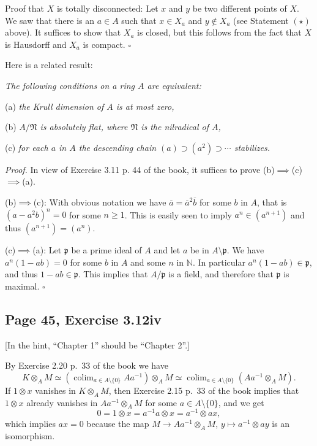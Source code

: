 \documentclass[parskip=half,fontsize=12pt]{scrartcl}%
\newcommand{\mf}{\mathfrak}
\newcommand{\mmm}{\mf m}
\newcommand{\ppp}{\mf p}
\DeclareMathOperator*{\colim}{colim}
\begin{document}
%
\begin{comment}
Let $\mu\in\mf m\subset A$ with $\mf m$ maximal. By Section~\ref{310ii} p.~\pageref{310ii} above, it suffices to show that, in the above notation, we have $\overline\mu=\overline0$. By Corollary 3.12 p.~42 of the book, this is equivalent to showing that the element $\mu/1$ of $A_\mmm$ is nilpotent, which is clear since $\mf m$ is a minimal prime ideal of $A$ (and thus $\mmm_\mmm$ is the nilradical of $A_\mmm$). $\square$
\end{comment}
%

Proof that $X$ is totally disconnected: Let $x$ and $y$ be two different points of $X$. We saw that there is an $a\in A$ such that $x\in X_a$ and $y\notin X_a$ (see Statement $(\star)$ above). It suffices to show that $X_a$ is closed, but this follows from the fact that $X$ is Hausdorff and $X_a$ is compact.  
$\square$

Here is a related result:

\emph{The following conditions on a ring $A$ are equivalent:}

(a) \emph{the Krull dimension of $A$ is at most zero,}

(b) \emph{$A/\mf N$ is absolutely flat, where $\mf N$ is the nilradical of $A$,}

(c) \emph{for each $a$ in $A$ the descending chain $(a)\supset(a^2)\supset\cdots$ stabilizes.}

\emph{Proof.} In view of Exercise 3.11 p. 44 of the book, it suffices to prove (b)$\implies$(c)$\implies$(a). 

(b)$\implies$(c): With obvious notation we have $\overline a=\overline a^2\overline b$ for some $b$ in $A$, that is $(a-a^2b)^n=0$ for some $n\ge1$. This is easily seen to imply $a^n\in(a^{n+1})$ and thus $(a^{n+1})=(a^n)$. 

(c)$\implies$(a): Let $\ppp$ be a prime ideal of $A$ and let $a$ be in $A\setminus\ppp$. We have $a^n(1-ab)=0$ for some $b$ in $A$ and some $n$ in $\mathbb N$. In particular $a^n(1-ab)\in\ppp$, and thus $1-ab\in\ppp$. This implies that $A/\ppp$ is a field, and therefore that $\ppp$ is maximal. $\square$

\subsection{Page 45, Exercise 3.12iv}%

[In the hint, ``Chapter 1'' should be ``Chapter 2''.]

By Exercise 2.20 p.~33 of the book we have 
$$
K\otimes_AM\simeq\left(\colim_{a\in A\setminus\{0\}}Aa^{-1}\right)\otimes_AM\simeq\colim_{a\in A\setminus\{0\}}\left(Aa^{-1}\otimes_AM\right).
$$ 
If $1\otimes x$ vanishes in $K\otimes_AM$, then Exercise 2.15 p.~33 of the book implies that $1\otimes x$ already vanishes in $Aa^{-1}\otimes_AM$ for some $a\in A\setminus\{0\}$, and we get 
$$
0=1\otimes x=a^{-1}a\otimes x=a^{-1}\otimes ax,
$$ 
which implies $ax=0$ because the map $M\to Aa^{-1}\otimes_AM$, $y\mapsto a^{-1}\otimes ay$ is an isomorphism. %
\end{document}
